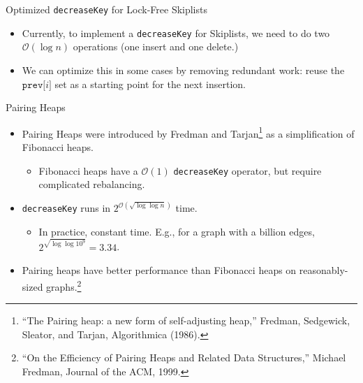 \documentclass{beamer}
\begin{document}
\begin{frame}{Optimized \texttt{decreaseKey} for Lock-Free Skiplists}
  \begin{itemize}
    \item Currently, to implement a \texttt{decreaseKey} for Skiplists, we need to
      do two $\mathcal{O}(\log n)$ operations (one insert and one delete.)
    \item We can optimize this in some cases by removing redundant work: reuse the
      $\mathtt{prev[}i\mathtt{]}$ set as a starting point for the next insertion.
  \end{itemize}
\end{frame}

\begin{frame}{Pairing Heaps}
  \begin{itemize}
    \item Pairing Heaps were introduced by Fredman and Tarjan\footnote{``The Pairing heap: a new form of self-adjusting heap,'' Fredman, Sedgewick, Sleator, and Tarjan, Algorithmica (1986).} as a simplification of Fibonacci heaps.
     \begin{itemize}
        \item Fibonacci heaps have a $\mathcal{O}(1)$ \texttt{decreaseKey} operator, but require complicated rebalancing.
      \end{itemize}
    \item \texttt{decreaseKey} runs in $2^{\mathcal{O}(\sqrt{\log \log n})}$ time.
        \begin{itemize}
          \item In practice, constant time. E.g., for a graph with a billion edges, $2^{\sqrt{\log \log 10^9}} = 3.34$.
        \end{itemize}
      \item Pairing heaps have better performance than Fibonacci heaps on reasonably-sized graphs.\footnote{``On the Efficiency of Pairing Heaps and Related Data Structures,'' Michael Fredman, Journal of the ACM, 1999.}
  \end{itemize}
\end{frame}
\end{document}
